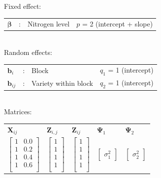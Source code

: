 \documentclass[a4paper,12pt]{article}
\begin{document}
		Fixed effect:\\[0.5em]
		\begin{tabular}{m{5mm} c m{45mm} l}
			$\boldsymbol\beta$ &:& Nitrogen level & $p$ = 2  (intercept + slope)\\
		\end{tabular}\\
		
		Random effects:\\[0.5em]
		\begin{tabular}{m{5mm} c m{45mm} l}
			$\mathbf{b}_i$ &:& Block & $q_1$ = 1 (intercept)\\
			$\mathbf{b}_{ij}$ &:& Variety within block & $q_2$ = 1 (intercept)\\
		\end{tabular}\\
		
		Matrices:\\[0.5em]
		\begin{tabularx}{1\textwidth}{>{\centering\arraybackslash}X
									  >{\centering\arraybackslash}X
									  >{\centering\arraybackslash}X
									  >{\centering\arraybackslash}X
									  >{\centering\arraybackslash}X}
			$\mathbf{X}_{ij}$ & $\mathbf{Z}_{i,j}$ & $\mathbf{Z}_{ij}$ & $\boldsymbol\Psi_1$ & $\boldsymbol\Psi_2$
			\\[0.5em]
			$\begin{bmatrix}
				1 & 0.0 \\
				1 & 0.2 \\
				1 & 0.4 \\
				1 & 0.6 \\
			\end{bmatrix}$ & 
			$\begin{bmatrix}
				1 \\
				1 \\
				1 \\
				1 \\
			\end{bmatrix}$ & 
			$\begin{bmatrix}
				1 \\
				1 \\
				1 \\
				1 \\
			\end{bmatrix}$ & 
			$\begin{bmatrix}
				\sigma_1^2
			\end{bmatrix}$ & 
			$\begin{bmatrix}
				\sigma_2^2
			\end{bmatrix}$\\
		\end{tabularx}		
	
\end{document}
